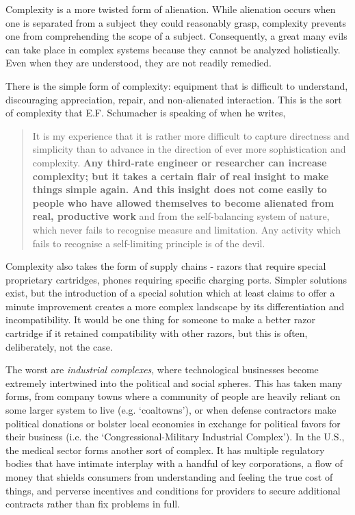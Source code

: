 \documentclass[letterpaper]{article}
\begin{document}
Complexity is a more twisted form of alienation. While alienation occurs when one is separated from a subject they could reasonably grasp, complexity prevents one from comprehending the scope of a subject. Consequently, a great many evils can take place in complex systems because they cannot be analyzed holistically. Even when they are understood, they are not readily remedied.

There is the simple form of complexity: equipment that is difficult to understand, discouraging appreciation, repair, and non-alienated interaction. This is the sort of complexity that E.F. Schumacher is speaking of when he writes,

\begin{quote}
  It is my experience that it is rather more difficult to capture directness and simplicity than to advance in the direction of ever more sophistication and complexity. \textbf{Any third-rate engineer or researcher can increase complexity; but it takes a certain flair of real insight to make things simple again. And this insight does not come easily to people who have allowed themselves to become alienated from real, productive work} and from the self-balancing system of nature, which never fails to recognise measure and limitation. Any activity which fails to recognise a self-limiting principle is of the devil.
\end{quote}

Complexity also takes the form of supply chains - razors that require special proprietary cartridges, phones requiring specific charging ports. Simpler solutions exist, but the introduction of a special solution which at least claims to offer a minute improvement creates a more complex landscape by its differentiation and incompatibility. It would be one thing for someone to make a better razor cartridge if it retained compatibility with other razors, but this is often, deliberately, not the case.

The worst are \textit{industrial complexes}, where technological businesses become extremely intertwined into the political and social spheres. This has taken many forms, from company towns where a community of people are heavily reliant on some larger system to live (e.g. `coaltowns'), or when defense contractors make political donations or bolster local economies in exchange for political favors for their business (i.e. the `Congressional-Military Industrial Complex'). In the U.S., the medical sector forms another sort of complex. It has multiple regulatory bodies that have intimate interplay with a handful of key corporations, a flow of money that shields consumers from understanding and feeling the true cost of things, and perverse incentives and conditions for providers to secure additional contracts rather than fix problems in full.
\end{document}
